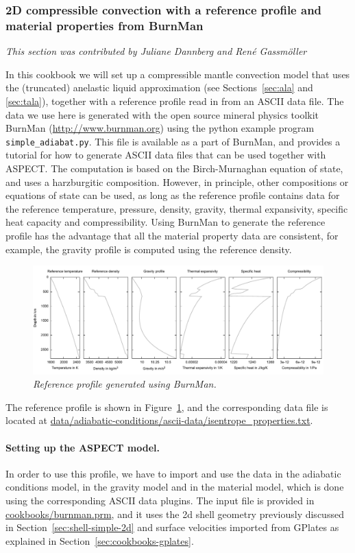 \documentclass{article}
\newcommand{\aspect}{\textsc{ASPECT}}
\begin{document}
\subsubsection{2D compressible convection with a reference profile and material properties from BurnMan}
\label{sec:cookbooks-burnman}
\textit{This section was contributed by Juliane Dannberg and Ren{\'e} Gassm{\"o}ller}

In this cookbook we will set up a compressible mantle convection model that uses 
the (truncated) anelastic liquid approximation (see Sections~\ref{sec:ala} and 
\ref{sec:tala}), together with a reference profile read in from an ASCII data file.
The data we use here is generated with the open source mineral physics toolkit BurnMan 
(\url{http://www.burnman.org}) using the python example program \texttt{simple\_adiabat.py}. 
This file is available as a part of BurnMan, and provides a tutorial for how to generate 
ASCII data files that can be used together with \aspect{}. 
The computation is based on the Birch-Murnaghan equation of state, and uses a harzburgitic 
composition. However, in principle, other compositions or equations of state can be used, 
as long as the reference profile contains data for the reference temperature, pressure, density, 
gravity, thermal expansivity, specific heat capacity and compressibility. Using BurnMan 
to generate the reference profile has the advantage that all the material property data 
are consistent, for example, the gravity profile is computed using the reference density.
\begin{figure}
  \includegraphics[width=\textwidth]{cookbooks/burnman/reference_profile.pdf}
  \caption{\it Reference profile generated using BurnMan.}
  \label{fig:burnman-reference-profile}
\end{figure}
The reference profile is shown in Figure~\ref{fig:burnman-reference-profile}, and the corresponding data file 
is located at \url{data/adiabatic-conditions/ascii-data/isentrope_properties.txt}.

\paragraph{Setting up the \aspect{} model.}
In order to use this profile, we have to import and use the data in the adiabatic conditions 
model, in the gravity model and in the material model, which is done using the corresponding 
ASCII data plugins. The input file is provided in \url{cookbooks/burnman.prm}, and it uses the 
2d shell geometry previously discussed in Section~\ref{sec:shell-simple-2d} and surface velocities
imported from GPlates as explained in Section~\ref{sec:cookbooks-gplates}.
\end{document}
